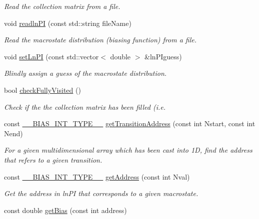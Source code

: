 \begin{DoxyCompactItemize}
\begin{DoxyCompactList}\small\item\em Read the collection matrix from a file. \end{DoxyCompactList}\item 
void \hyperlink{classtmmc_a0c6c9f978b2093d1f4f6da7842093f3f}{readln\+P\+I} (const std\+::string file\+Name)
\begin{DoxyCompactList}\small\item\em Read the macrostate distribution (biasing function) from a file. \end{DoxyCompactList}\item 
void \hyperlink{classtmmc_a4bd3a47406bf765234e1cb3a391c79d5}{set\+Ln\+P\+I} (const std\+::vector$<$ double $>$ \&ln\+P\+Iguess)
\begin{DoxyCompactList}\small\item\em Blindly assign a guess of the macrostate distribution. \end{DoxyCompactList}\item 
bool \hyperlink{classtmmc_aa51f03f958dabefcff97be4a7c3b336c}{check\+Fully\+Visited} ()
\begin{DoxyCompactList}\small\item\em Check if the the collection matrix has been filled (i.\+e. \end{DoxyCompactList}\item 
const \hyperlink{bias_8h_a1ceb524363fcb94da0c64d297ea27438}{\+\_\+\+\_\+\+B\+I\+A\+S\+\_\+\+I\+N\+T\+\_\+\+T\+Y\+P\+E\+\_\+\+\_\+} \hyperlink{classtmmc_a7c006c0107ba4c1d52e75fc80d8581d6}{get\+Transition\+Address} (const int Nstart, const int Nend)
\begin{DoxyCompactList}\small\item\em For a given multidimensional array which has been cast into 1\+D, find the address that refers to a given transition. \end{DoxyCompactList}\item 
const \hyperlink{bias_8h_a1ceb524363fcb94da0c64d297ea27438}{\+\_\+\+\_\+\+B\+I\+A\+S\+\_\+\+I\+N\+T\+\_\+\+T\+Y\+P\+E\+\_\+\+\_\+} \hyperlink{classtmmc_aa93ae04c2712ef208ed4cb01b9dd1905}{get\+Address} (const int Nval)
\begin{DoxyCompactList}\small\item\em Get the address in ln\+P\+I that corresponds to a given macrostate. \end{DoxyCompactList}\item 
const double \hyperlink{classtmmc_afbcaaf974280aad6d78ca7e112438641}{get\+Bias} (const int address)
\end{DoxyCompactItemize}


